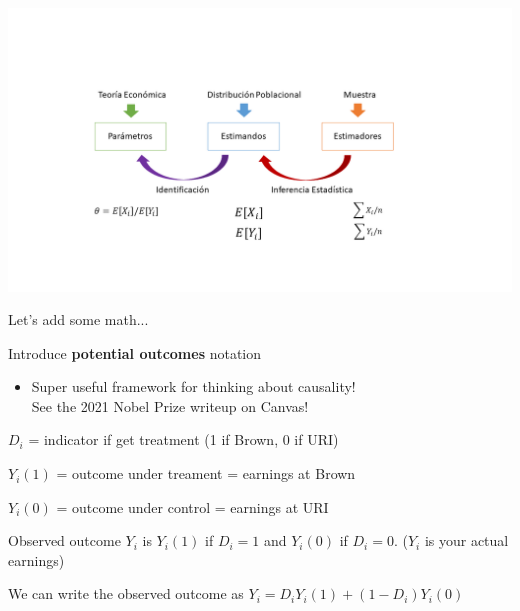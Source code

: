 \documentclass[11pt,handout,aspectratio=169]{beamer}
\newenvironment{wideitemize}{\itemize\addtolength{\itemsep}{10pt}}{\enditemize}
\begin{document}
\begin{frame}
\vspace{-10mm}
	\includegraphics[width=1.2\textwidth]{BigPicture}
\end{frame}


\begin{frame}{Let's add some math...}
\begin{wideitemize}
	\item Introduce \textbf{potential outcomes} notation
		\begin{itemize}
			\item 
			Super useful framework for thinking about causality! \\
			See the 2021 Nobel Prize writeup on Canvas!
		\end{itemize}
	
	\pause 
	\item $D_i$ = indicator if get treatment (1 if Brown, 0 if URI)
	
	\pause
	\item $Y_i(1)$ = outcome under treament = earnings at Brown
	\item $Y_i(0)$ = outcome under control = earnings at URI
	
	\pause 
	\item Observed outcome $Y_i$ is $Y_i(1)$ if $D_i = 1$ and $Y_i(0)$ if $D_i = 0$. ($Y_i$ is your actual earnings)
	
	\pause
	\item
	We can write the observed outcome as $Y_i = D_i Y_i(1) + (1-D_i) Y_i(0)$
\end{wideitemize}

\end{frame}
\end{document}
